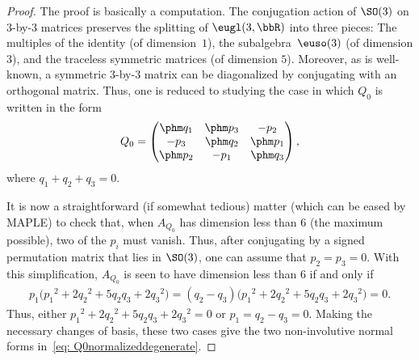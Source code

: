 \begin{proof}
The proof is basically a computation. The conjugation action of $\SO(3)$
on $3$-by-$3$ mat\-rices preserves the splitting of $\eugl(3,\bbR)$
into three pieces: The multiples of the identity (of dimension~$1$),
the subalgebra~$\euso(3)$ (of dimension $3$),
and the traceless symmetric matrices (of dimension $5$).
Moreover, as is well-known, a symmetric $3$-by-$3$ matrix can be
diagonalized by conjugating with an orthogonal matrix. Thus, one
is reduced to studying the case in which $Q_0$ is written in the form
\begin{gather}\label{eq: Q0normalized}
Q_0 = \begin{pmatrix}\phm q_1&\phm p_3&-p_2\\
 -p_3&\phm q_2&\phm p_1\\
 \phm p_2&-p_1&\phm q_3\end{pmatrix},
\end{gather}
where $q_1+q_2+q_3 = 0$.

It is now a straightforward (if somewhat tedious) matter
(which can be eased by MAPLE) to check that, when $A_{Q_0}$
has dimension less than $6$ (the maximum possible),
two of the $p_i$ must vanish. Thus, after conjugating by
a signed permutation matrix that lies in $\SO(3)$,
one can assume that $p_2=p_3=0$.
With this simplification, $A_{Q_0}$ is seen to have dimension
less than $6$ if and only if
\begin{gather*}
p_1 \big({p_1}^2 + 2{q_2}^2 + 5q_2q_3 + 2{q_3}^2\big) =
(q_2 - q_3) \big({p_1}^2 + 2{q_2}^2 + 5q_2q_3 + 2{q_3}^2\big) = 0.
\end{gather*}
Thus, either ${p_1}^2 + 2{q_2}^2 + 5q_2q_3 + 2{q_3}^2=0$ or $p_1=q_2-q_3=0$.
Making the necessary changes of basis,
these two cases give the two non-involutive normal forms
in~\eqref{eq: Q0normalizeddegenerate}.


\end{proof}
